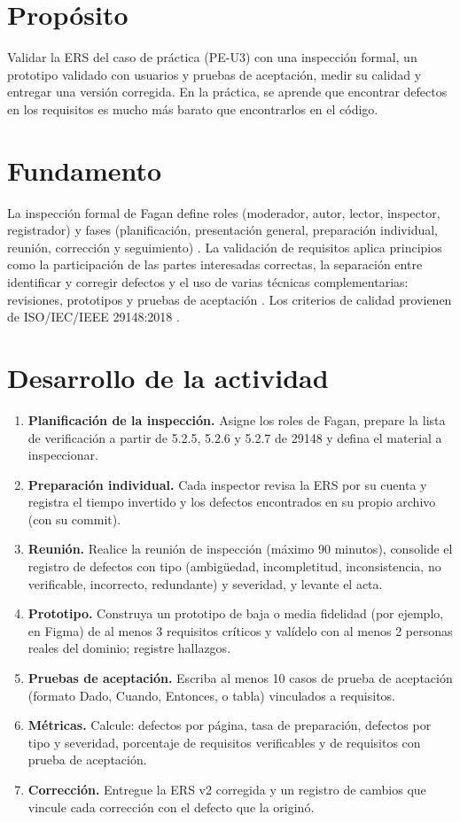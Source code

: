 \documentclass[11pt]{article}
\newcommand{\seccion}[1]{\section{\textcolor{utegreendk}{#1}}}
\begin{document}
\seccion{Propósito}

Validar la ERS del caso de práctica (PE-U3) con una inspección formal, un prototipo validado con usuarios y pruebas de aceptación, medir su calidad y entregar una versión corregida. En la práctica, se aprende que encontrar defectos en los requisitos es mucho más barato que encontrarlos en el código.

\seccion{Fundamento}

La inspección formal de Fagan define roles (moderador, autor, lector, inspector, registrador) y fases (planificación, presentación general, preparación individual, reunión, corrección y seguimiento) \citep{fagan_1976}. La validación de requisitos aplica principios como la participación de las partes interesadas correctas, la separación entre identificar y corregir defectos y el uso de varias técnicas complementarias: revisiones, prototipos y pruebas de aceptación \citep{pohl_2025,swebok_v4_2024}. Los criterios de calidad provienen de ISO/\allowbreak{}IEC/\allowbreak{}IEEE 29148:2018 \citep{iso29148_2018}.

\seccion{Desarrollo de la actividad}

\begin{enumerate}[leftmargin=20pt,itemsep=4pt]
	\item \textbf{Planificación de la inspección.} Asigne los roles de Fagan, prepare la lista de verificación a partir de 5.2.5, 5.2.6 y 5.2.7 de 29148 y defina el material a inspeccionar.
	\item \textbf{Preparación individual.} Cada inspector revisa la ERS por su cuenta y registra el tiempo invertido y los defectos encontrados en su propio archivo (con su commit).
	\item \textbf{Reunión.} Realice la reunión de inspección (máximo 90 minutos), consolide el registro de defectos con tipo (ambigüedad, incompletitud, inconsistencia, no verificable, incorrecto, redundante) y severidad, y levante el acta.
	\item \textbf{Prototipo.} Construya un prototipo de baja o media fidelidad (por ejemplo, en Figma) de al menos 3 requisitos críticos y valídelo con al menos 2 personas reales del dominio; registre hallazgos.
	\item \textbf{Pruebas de aceptación.} Escriba al menos 10 casos de prueba de aceptación (formato Dado, Cuando, Entonces, o tabla) vinculados a requisitos.
	\item \textbf{Métricas.} Calcule: defectos por página, tasa de preparación, defectos por tipo y severidad, porcentaje de requisitos verificables y de requisitos con prueba de aceptación.
	\item \textbf{Corrección.} Entregue la ERS v2 corregida y un registro de cambios que vincule cada corrección con el defecto que la originó.
\end{enumerate}
\end{document}
